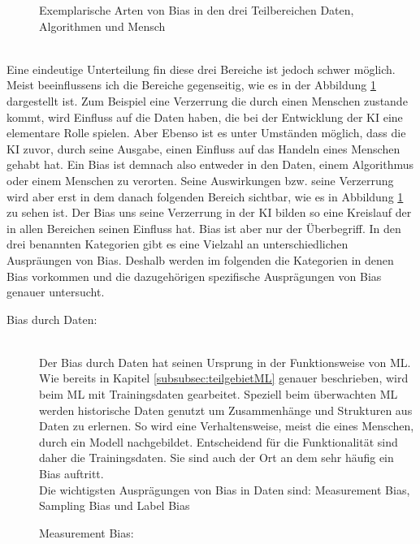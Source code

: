 \begin{onehalfspace}
\begin{figure}[h]
            \caption{Exemplarische Arten von Bias in den drei Teilbereichen Daten, Algorithmen und Mensch \cite{Mehrabi2021}}
            \label{fig:BiasCycle}
        \end{figure}\\
        Eine eindeutige Unterteilung fin diese drei Bereiche ist jedoch schwer möglich. Meist beeinflussens ich die Bereiche gegenseitig, wie es in der Abbildung \ref*{fig:BiasCycle} dargestellt ist. Zum Beispiel eine Verzerrung die durch einen Menschen zustande kommt, wird Einfluss auf die Daten haben, die bei der Entwicklung der \ac{KI} eine elementare Rolle spielen. Aber Ebenso ist es unter Umständen möglich, dass die \ac{KI} zuvor, durch seine Ausgabe, einen Einfluss auf das Handeln eines Menschen gehabt hat.\cite{Mehrabi2021} Ein Bias ist demnach also entweder in den Daten, einem Algorithmus oder einem Menschen zu verorten. Seine Auswirkungen bzw. seine Verzerrung wird aber erst in dem danach folgenden Bereich sichtbar, wie es in Abbildung \ref*{fig:BiasCycle} zu sehen ist. Der Bias uns seine Verzerrung in der \ac*{KI} bilden so eine Kreislauf der in allen Bereichen seinen Einfluss hat.\cite*[]{Mehrabi2021}
        Bias ist aber nur der Überbegriff. In den drei benannten Kategorien gibt es eine Vielzahl an unterschiedlichen Auspräungen von Bias. Deshalb werden im folgenden die Kategorien in denen Bias vorkommen und die dazugehörigen spezifische Ausprägungen von Bias genauer untersucht.
        \begin{description}
            \item [Bias durch Daten:]\hfill \\
            Der Bias durch Daten hat seinen Ursprung in der Funktionsweise von \ac{ML}. Wie bereits in Kapitel \ref{subsubsec:teilgebietML} genauer beschrieben, wird beim \ac{ML} mit Trainingsdaten gearbeitet. Speziell beim überwachten \ac*{ML} werden historische Daten genutzt um Zusammenhänge und Strukturen aus Daten zu erlernen. So wird eine Verhaltensweise, meist die eines Menschen, durch ein Modell nachgebildet. Entscheidend für die Funktionalität sind daher die Trainingsdaten. Sie sind auch der Ort an dem sehr häufig ein Bias auftritt.\cite{silberg2019notes}\cite{Drew2019}
            \\
            Die wichtigsten Ausprägungen von Bias in Daten sind: Measurement Bias, Sampling Bias und Label Bias\cite{srinivasan2021biases}\cite{Mehrabi2021}
            \begin{description}
                \item [Measurement Bias:] \hfill \\

\end{description}
\end{description}
\end{onehalfspace}
